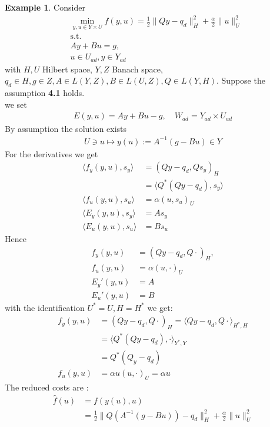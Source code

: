 \documentclass[a4paper,11pt,fleqn]{book}
\theoremstyle{definition}
\newtheorem*{example}{Example}
\theoremstyle{remark}
\begin{document}
\begin{example}
Consider 
\begin{align*}
	&\min_{y, u \in Y \times U} f(y, u) = \frac{1}{2} \|Qy - q_d\|_H^2  + \frac{\alpha}{2}\|u\|_U^2\\
	&\text{s.t.}\\
	& Ay + Bu = g,\\
	&u \in U_{ad}, y \in Y_{ad}
\end{align*}	
with $H,U$ Hilbert space, $Y, Z$ Banach space, $q_d \in H, g \in Z, A \in L(Y, Z), B \in L(U, Z), Q \in L(Y, H)$. Suppose the assumption \textbf{4.1} holds.\\
we set 
\begin{align*}
	E(y, u) = Ay + Bu - g, \quad W_{ad} = Y_{ad} \times U_{ad}
\end{align*}
By assumption the solution exists 
\begin{align*}
	U \ni u \mapsto y(u):= A^{-1}(g - Bu) \in Y
\end{align*}
For the derivatives we get
\begin{align*}
	\langle f_y(y, u), s_y\rangle &= (Qy - q_d, Q s_y)_H\\
	&= \langle Q^* (Qy - q_d), s_y \rangle \\
	\langle f_u(y, u), s_u \rangle &= \alpha (u, s_u)_U\\
	\langle E_y(y, u), s_y \rangle &= As_y \\
	\langle E_u(y, u), s_u \rangle &= B s_u
\end{align*}
Hence
\begin{align*}
	f_y(y, u) &= (Qy - q_d, Q \cdot)_H, \\
	f_u(y, u) &= \alpha (u, \cdot)_U\\
	E_y'(y, u) &= A\\
	E_u'(y, u) &= B 
\end{align*}
with the identification $U^* = U, H = H^*$ we get:
\begin{align*}
	f_y(y, u) &= (Qy - q_d, Q \cdot)_H = \langle Qy - q_d, Q \cdot \rangle_{H^*, H}\\
	&= \langle Q^*(Qy- q_d), \cdot \rangle_{Y^*, Y} \\
	&= Q^*(Q_y - q_d)\\
	f_u(y, u) &= \alpha u(u, \cdot)_U = \alpha u
\end{align*}
The reduced costs are :
\begin{align*}
	\hat{f}(u) &= f(y(u), u) \\
	&= \frac{1}{2} \|Q(A^{-1}(g - Bu)) - q_d\|_H^2 + \frac{\alpha}{2}\|u\|_U^2

\end{align*}
\end{example}
\end{document}
